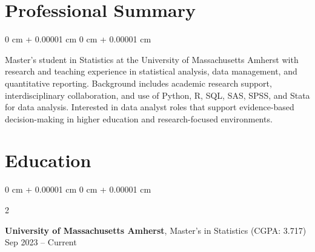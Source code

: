 \documentclass[10pt, letterpaper]{article}
\newenvironment{highlightsforbulletentries}{
    \begin{itemize}[
        topsep=0.10 cm,
        parsep=0.10 cm,
        partopsep=0pt,
        itemsep=0pt,
        leftmargin=10pt
    ]
}{
    \end{itemize}
} %
\newenvironment{onecolentry}{
    \begin{adjustwidth}{
        0 cm + 0.00001 cm
    }{
        0 cm + 0.00001 cm
    }
}{
    \end{adjustwidth}
} %
\newenvironment{twocolentry}[2][]{
    \onecolentry
    \def\secondColumn{#2}
    \setcolumnwidth{\fill, 4.5 cm}
    \begin{paracol}{2}
}{
    \switchcolumn \raggedleft \secondColumn
    \end{paracol}
    \endonecolentry
} %
\begin{document}








    \section{Professional Summary}

        \begin{onecolentry}
            \justifying
            Master's student in Statistics at the University of Massachusetts Amherst with research and teaching experience in statistical analysis, data management, and quantitative reporting. Background includes academic research support, interdisciplinary collaboration, and use of Python, R, SQL, SAS, SPSS, and Stata for data analysis. Interested in data analyst roles that support evidence-based decision-making in higher education and research-focused environments.
        \end{onecolentry}

    \section{Education}

        \begin{twocolentry}{
            Sep 2023 – Current
        }
            \textbf{University of Massachusetts Amherst}, Master's in Statistics (CGPA: 3.717) \end{twocolentry}
\end{document}
